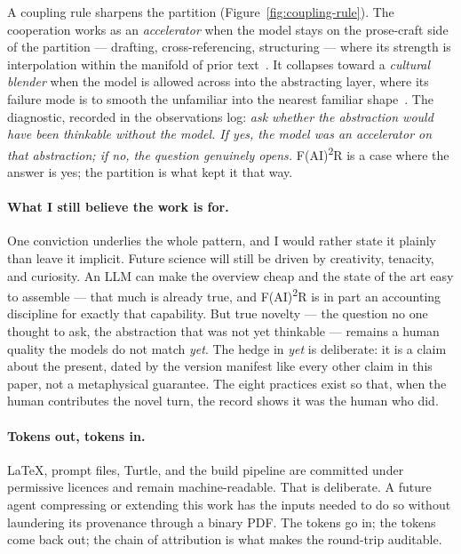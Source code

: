 A coupling rule sharpens the partition
(Figure~\ref{fig:coupling-rule}). The cooperation works as an
\emph{accelerator} when the model stays on the prose-craft side of
the partition --- drafting, cross-referencing, structuring ---
where its strength is interpolation within the manifold of prior
text~\cite{clark1998extended,hutchins1995cognition,clark2025extending}.
It collapses toward a \emph{cultural blender} when the model is
allowed across into the abstracting layer, where its failure mode
is to smooth the unfamiliar into the nearest familiar
shape~\cite{anderson2024homogenization}. The
diagnostic, recorded in the observations log: \emph{ask whether
the abstraction would have been thinkable without the model. If
yes, the model was an accelerator on that abstraction; if no, the
question genuinely opens.} F(AI)\textsuperscript{2}R is a case
where the answer is yes; the partition is what kept it that way.

\paragraph{What I still believe the work is for.}
One conviction underlies the whole pattern, and I would rather
state it plainly than leave it implicit. Future science will
still be driven by creativity, tenacity, and curiosity. An LLM
can make the overview cheap and the state of the art easy to
assemble --- that much is already true, and
F(AI)\textsuperscript{2}R is in part an accounting discipline
for exactly that capability. But true novelty --- the question
no one thought to ask, the abstraction that was not yet
thinkable --- remains a human quality the models do not match
\emph{yet}. The hedge in \emph{yet} is deliberate: it is a
claim about the present, dated by the version manifest like
every other claim in this paper, not a metaphysical guarantee.
The eight practices exist so that, when the human contributes
the novel turn, the record shows it was the human who did.

\paragraph{Tokens out, tokens in.}
\LaTeX{}, prompt files, Turtle, and the build pipeline are
committed under permissive licences and remain machine-readable.
That is deliberate. A future agent compressing or extending this
work has the inputs needed to do so without laundering its
provenance through a binary PDF. The tokens go in; the tokens come
back out; the chain of attribution is what makes the round-trip
auditable.
